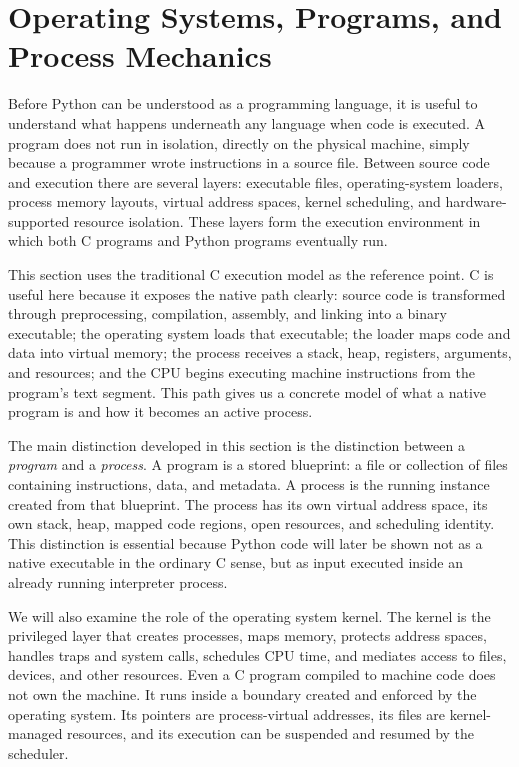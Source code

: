\documentclass[a4paper,twoside]{report}
\begin{document}
\section{Operating Systems, Programs, and Process Mechanics}

Before Python can be understood as a programming language, it is useful to understand what happens underneath any language when code is executed. A program does not run in isolation, directly on the physical machine, simply because a programmer wrote instructions in a source file. Between source code and execution there are several layers: executable files, operating-system loaders, process memory layouts, virtual address spaces, kernel scheduling, and hardware-supported resource isolation. These layers form the execution environment in which both C programs and Python programs eventually run.

This section uses the traditional C execution model as the reference point. C is useful here because it exposes the native path clearly: source code is transformed through preprocessing, compilation, assembly, and linking into a binary executable; the operating system loads that executable; the loader maps code and data into virtual memory; the process receives a stack, heap, registers, arguments, and resources; and the CPU begins executing machine instructions from the program's text segment. This path gives us a concrete model of what a native program is and how it becomes an active process.

The main distinction developed in this section is the distinction between a \emph{program} and a \emph{process}. A program is a stored blueprint: a file or collection of files containing instructions, data, and metadata. A process is the running instance created from that blueprint. The process has its own virtual address space, its own stack, heap, mapped code regions, open resources, and scheduling identity. This distinction is essential because Python code will later be shown not as a native executable in the ordinary C sense, but as input executed inside an already running interpreter process.

We will also examine the role of the operating system kernel. The kernel is the privileged layer that creates processes, maps memory, protects address spaces, handles traps and system calls, schedules CPU time, and mediates access to files, devices, and other resources. Even a C program compiled to machine code does not own the machine. It runs inside a boundary created and enforced by the operating system. Its pointers are process-virtual addresses, its files are kernel-managed resources, and its execution can be suspended and resumed by the scheduler.
\end{document}
